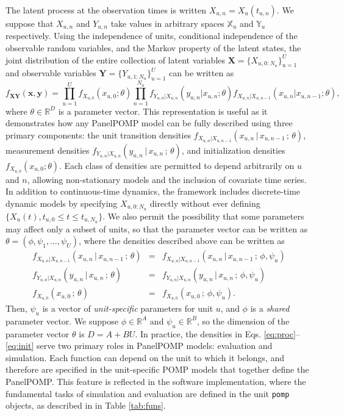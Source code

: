 The latent process at the observation times is written \(X_{u,n}=X_u(t_{u,n})\).
We suppose that \(X_{u,n}\) and \(Y_{u,n}\) take values in arbitrary spaces \(\mathbb{X}_{u}\) and \(\mathbb{Y}_{u}\) respectively.
Using the independence of units, conditional independence of the observable random variables, and the Markov property of the latent states, the joint distribution of the entire collection of latent variables \(\mathbf{X} = \{X_{u,0:N_u}\}_{u = 1}^U\) and observable variables \(\mathbf{Y} = \{Y_{u,1:N_u}\}_{u = 1}^U\) can be written as
\[
f_{\mathbf{X}\mathbf{Y}}(\mathbf{x}, \mathbf{y}) = \prod_{u = 1}^U f_{X_{u, 0}}(x_{u,0}; \theta)\prod_{n = 1}^{N_u} f_{Y_{u, n}|X_{u, n}}(y_{u, n}|x_{u, n}; \theta)f_{X_{u, n}|X_{u, n-1}}(x_{u, n}|x_{u, n-1}; \theta),
\]
where \(\theta\in\mathbb{R}^{D}\) is a parameter vector.
This representation is useful as it demonstrates how any PanelPOMP model can be fully described using three primary components: the unit transition densities
\(f_{X_{u,n}|X_{u,n-1}}(x_{u,n}\,|\, x_{u,n-1}\,;\,\theta)\),
measurement densities
\(f_{Y_{u,n}|X_{u,n}}(y_{u,n}\,|\, x_{u,n}\,;\,\theta)\),
and initialization densities
\(f_{X_{u, 0}}(x_{u,0}; \theta)\).
Each class of densities are permitted to depend arbitrarily on \(u\) and \(n\), allowing non-stationary models and the inclusion of covariate time series.
In addition to continuous-time dynamics, the framework includes discrete-time dynamic models by specifying \(X_{u,0:N_u}\) directly without ever defining \(\{X_u(t),t_{u,0}\le t\le t_{u,N_u}\}\).
We also permit the possibility that some parameters may affect only a subset of units, so that the parameter vector can be written as
\(\theta=(\phi,\psi_1,\dots,\psi_U)\),
where the densities described above can be written as
\begin{eqnarray}
f_{X_{u,n}\vert X_{u,n-1}}(x_{u,n}\,|\, x_{u,n-1} \,;\, \theta)
&=&
f_{X_{u,n}|X_{u,n-1}}(x_{u,n}\,|\, x_{u,n-1} \,;\, \phi,\psi_u) \label{eq:proc}
\\
f_{Y_{u,n}|X_{u,n}}(y_{u,n}\,|\, x_{u,n} \,;\, \theta) &=& f_{Y_{u,n}|X_{u,n}}(y_{u,n}\,|\, x_{u,n} \,;\, \phi,\psi_u) \label{eq:meas}
\\
f_{X_{u,0}}(x_{u,0} \,;\, \theta) &=& f_{X_{u,0}}(x_{u,0} \,;\, \phi,\psi_u). \label{eq:init}
\end{eqnarray}
Then, \(\psi_{u}\) is a vector of \emph{unit-specific} parameters for unit \(u\), and \(\phi\) is a \emph{shared} parameter vector.
We suppose \(\phi\in\mathbb{R}^{A}\) and \(\psi_{u}\in\mathbb{R}^{B}\), so the dimension of the parameter vector \(\theta\) is \(D=A+BU\).
In practice, the densities in Eqs. \eqref{eq:proc}--\eqref{eq:init} serve two primary roles in PanelPOMP models: evaluation and simulation.
Each function can depend on the unit to which it belongs, and therefore are specified in the unit-specific POMP models that together define the PanelPOMP.
This feature is reflected in the software implementation, where the fundamental tasks of simulation and evaluation are defined in the unit \texttt{pomp} objects, as described in in Table \ref{tab:funs}.

